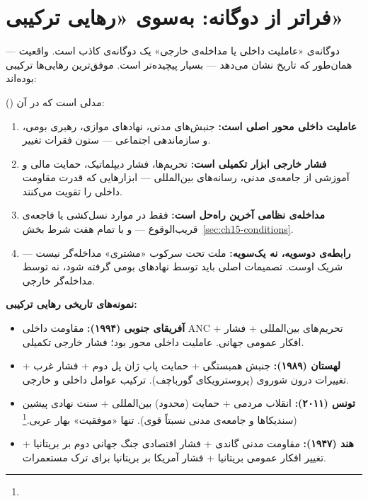\section{فراتر از دوگانه: به‌سوی «رهایی ترکیبی»}
\label{sec:ch15-hybrid-liberation}

دوگانه‌ی «عاملیت داخلی یا مداخله‌ی خارجی» یک دوگانه‌ی کاذب است. واقعیت — همان‌طور که تاریخ نشان می‌دهد — بسیار پیچیده‌تر است. موفق‌ترین رهایی‌ها ترکیبی بوده‌اند:

\begin{tcolorbox}[defbox, title={مفهوم: رهایی ترکیبی}]
 () مدلی است که در آن:
\begin{enumerate}
\item \textbf{عاملیت داخلی محور اصلی است:} جنبش‌های مدنی، نهادهای موازی، رهبری بومی، و سازماندهی اجتماعی — ستون فقرات تغییر.
\item \textbf{فشار خارجی ابزار تکمیلی است:} تحریم‌ها، فشار دیپلماتیک، حمایت مالی و آموزشی از جامعه‌ی مدنی، رسانه‌های بین‌المللی — ابزارهایی که قدرت مقاومت داخلی را تقویت می‌کنند.
\item \textbf{مداخله‌ی نظامی آخرین راه‌حل است:} فقط در موارد نسل‌کشی یا فاجعه‌ی قریب‌الوقوع — و با تمام هفت شرط بخش~\ref{sec:ch15-conditions}.
\item \textbf{رابطه‌ی دوسویه، نه یک‌سویه:} ملت تحت سرکوب «مشتری» مداخله‌گر نیست — شریک اوست. تصمیمات اصلی باید توسط نهادهای بومی گرفته شود، نه توسط مداخله‌گر خارجی.
\end{enumerate}
\end{tcolorbox}

\textbf{نمونه‌های تاریخی رهایی ترکیبی:}

\begin{itemize}
\item \textbf{آفریقای جنوبی (۱۹۹۴):} مقاومت داخلی ANC + تحریم‌های بین‌المللی + فشار افکار عمومی جهانی. عاملیت داخلی محور بود؛ فشار خارجی تکمیلی.
\item \textbf{لهستان (۱۹۸۹):} جنبش همبستگی + حمایت پاپ ژان پل دوم + فشار غرب + تغییرات درون شوروی (پروسترویکای گورباچف). ترکیب عوامل داخلی و خارجی.
\item \textbf{تونس (۲۰۱۱):} انقلاب مردمی + حمایت (محدود) بین‌المللی + سنت نهادی پیشین (سندیکاها و جامعه‌ی مدنی نسبتاً قوی). تنها «موفقیت» بهار عربی.\footnote{}
\item \textbf{هند (۱۹۴۷):} مقاومت مدنی گاندی + فشار اقتصادی جنگ جهانی دوم بر بریتانیا + تغییر افکار عمومی بریتانیا + فشار آمریکا بر بریتانیا برای ترک مستعمرات.
\end{itemize}

